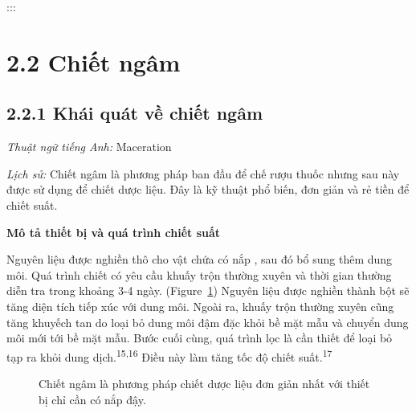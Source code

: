 \documentclass[
  twocolumn,
  landscape]{report}
\begin{document}
:::

\section{2.2 Chiết ngâm}\label{chiux1ebft-nguxe2m}

\subsection{2.2.1 Khái quát về chiết
ngâm}\label{khuxe1i-quuxe1t-vux1ec1-chiux1ebft-nguxe2m}

\emph{Thuật ngữ tiếng Anh:} Maceration

\emph{Lịch sử:} Chiết ngâm là phương pháp ban đầu để chế rượu thuốc
nhưng sau này được sử dụng để chiết dược liệu. Đây là kỹ thuật phổ biến,
đơn giản và rẻ tiền để chiết suất.

\textbf{Mô tả thiết bị và quá trình chiết suất}

Nguyên liệu được nghiền thô cho vật chứa có nắp , sau đó bổ sung thêm
dung môi. Quá trình chiết có yêu cầu khuấy trộn thường xuyên và thời
gian thường diễn tra trong khoảng 3-4 ngày.
(Figure~\ref{fig-LaMaceration}) Nguyên liệu được nghiền thành bột sẽ
tăng diện tích tiếp xúc với dung môi. Ngoài ra, khuấy trộn thường xuyên
cũng tăng khuyếch tan do loại bỏ dung môi đậm đặc khỏi bề mặt mẫu và
chuyển dung môi mới tới bề mặt mẫu. Bước cuối cùng, quá trình lọc là cần
thiết để loại bỏ tạp ra khỏi dung dịch.\textsuperscript{15,16} Điều này
làm tăng tốc độ chiết suất.\textsuperscript{17}

\begin{figure}


\caption{\label{fig-LaMaceration}Chiết ngâm là phương pháp chiết dược
liệu đơn giản nhất với thiết bị chỉ cần có nắp đậy.}

\end{figure}%
\end{document}
